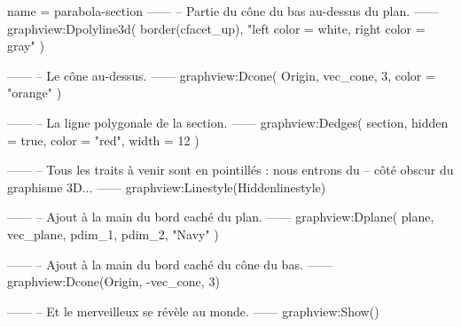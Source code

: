 \documentclass{standalone}
\begin{document}
\begin{luadraw}{name = parabola-section}
------
-- Partie du cône du bas au-dessus du plan.
------
graphview:Dpolyline3d(
  border(cfacet_up),
  "left color = white, right color = gray"
)

------
-- Le cône au-dessus.
------
graphview:Dcone(
  Origin, vec_cone, 3,
  {
    color = "orange"
  })

------
-- La ligne polygonale de la section.
------
graphview:Dedges(
  section,
  {
    hidden = true, color = "red", width = 12
  })

------
-- Tous les traits à venir sont en pointillés : nous entrons du
-- côté obscur du graphisme 3D...
------
graphview:Linestyle(Hiddenlinestyle)

------
-- Ajout à la main du bord caché du plan.
------
graphview:Dplane(
  plane,
  vec_plane, pdim_1, pdim_2,
  "Navy"
)

------
-- Ajout à la main du bord caché du cône du bas.
------
graphview:Dcone(Origin, -vec_cone, 3)

------
-- Et le merveilleux se révèle au monde.
------
graphview:Show()
\end{luadraw}
\end{document}
